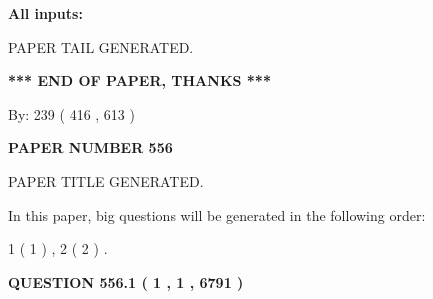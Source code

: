 \documentclass[12pt]{article}
\begin{document}
   
   
   
\noindent{}
   
   
   
   
\noindent\vspace{0.1in}\hspace{-0.08in} {\textbf{\Large{All inputs: }}}
   
   
   
   
   
   
 \vspace{0.2in}
 
   
   
\vspace{2.0in} PAPER TAIL GENERATED.
   
   
   
   
\vspace{1.0in} 
{\textbf{\large{ *** END OF PAPER, THANKS *** }}} 
   
   
\hspace{1.0in} By: 
 239 ( 416 ,  613 )
   
   
   
   
\newpage 
\setcounter{page}{ 
   556001 } 
   
   
   
   
 {\textbf{ \Large{ PAPER NUMBER  556  }}}
   
   
\vspace{0.2in}
   
   
   
   
   
   
   
   
 \vspace{0.2in}
 
 
 
 
   
   
 PAPER TITLE GENERATED.
   
   
   
\vspace{0.2in}
   
In this paper, big questions will be generated in the following order: 
   
   
   1 ( 1 )
 ,
   2 ( 2 )
 .
  
\vspace{0.2in}
  
{\textbf{\Large{QUESTION
556.1 
 ( 1 , 1 , 6791 )
}}}
  
\end{document}
